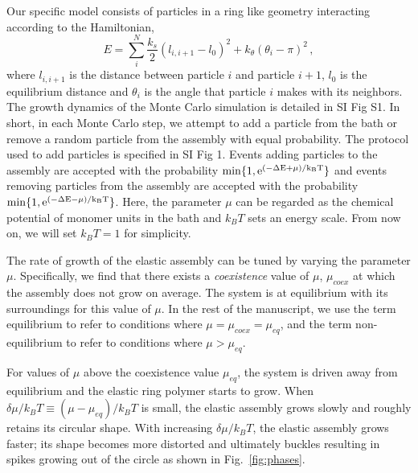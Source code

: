 \documentclass[amsmath,preprintnumbers,10pt,nofootinbib,prl,twocolumn]{revtex4-1}
\begin{document}
Our specific model consists of particles in a ring like geometry interacting according to the Hamiltonian, 
\begin{equation}
\label{eq:Halmitonianl}
E=\sum_i^N{\frac{k_s}{2}(l_{i,i+1}-l_0)^2+k_\theta(\theta_i-\pi)^2}\,,
\end{equation}
where $l_{i,i+1}$ is the distance between particle $i$ and particle $i+1$, $l_0$ is the equilibrium distance and $\theta_i$ is the angle that particle $i$ makes with its neighbors. The growth dynamics of the Monte Carlo simulation is detailed in SI Fig S1. In short, in each Monte Carlo step, we attempt to add a particle from the bath or remove a random particle from the assembly with equal probability. The protocol used to add particles is specified in SI Fig 1.  Events adding particles to the assembly are accepted with the probability $\rm{min}\{1,e^{(-\Delta E +\mu)/k_B T}\}$ and events removing particles from the assembly are accepted with the probability $\rm{min}\{1,e^{(-\Delta E -\mu)/k_B T}\}$. Here, the parameter $\mu$ can be regarded as the chemical potential of monomer units in the bath and $k_B T$ sets an energy scale. From now on, we will set $k_B T = 1$ for simplicity. 

The rate of growth of the elastic assembly can be tuned by varying the parameter $\mu$. Specifically, we find that there exists a \textit{coexistence} value of $\mu$, $\mu_{coex}$ at which the assembly does not grow on average. The system is at equilibrium with its surroundings for this value of $\mu$. In the rest of the manuscript, we use the term equilibrium to refer to conditions where $\mu =\mu_{coex}=\mu_{eq}$, and the term non-equilibrium to refer to conditions where $\mu > \mu_{eq}$. 

For values of $\mu$ above the coexistence value $\mu_{eq}$, the system is driven away from equilibrium and the elastic ring polymer starts to grow. When $\delta\mu/k_BT \equiv (\mu-\mu_{eq})/k_B T$ is small, the elastic assembly grows slowly and roughly retains its circular shape. With increasing $\delta\mu/k_B T$, the elastic assembly grows faster; its shape becomes more distorted and ultimately buckles resulting in spikes growing out of the circle as shown in Fig.~\ref{fig:phases}. 
\end{document}
